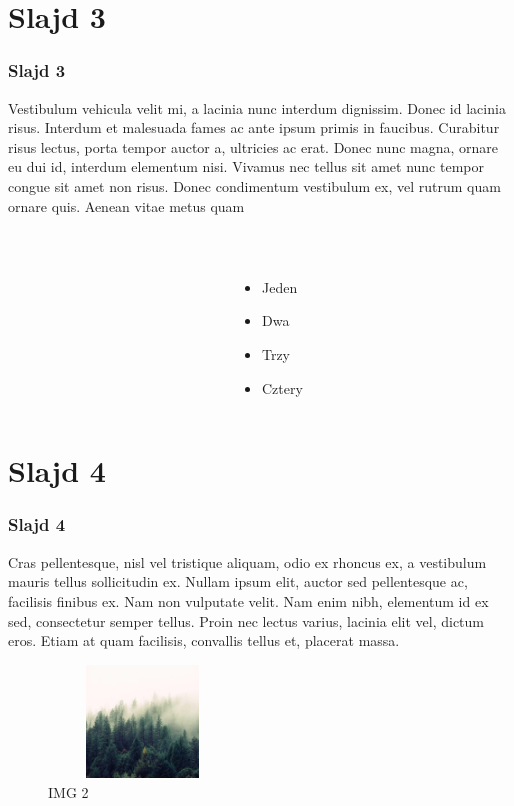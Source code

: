 \documentclass{beamer}
\begin{document}
\section{Slajd 3}
	\begin{frame}
		\frametitle{Slajd 3}
			 Vestibulum vehicula velit mi, a lacinia nunc interdum dignissim. Donec id lacinia risus. Interdum et malesuada fames ac ante ipsum primis in faucibus. Curabitur risus lectus, porta tempor auctor a, ultricies ac erat. Donec nunc magna, ornare eu dui id, interdum elementum nisi. Vivamus nec tellus sit amet nunc tempor congue sit amet non risus. Donec condimentum vestibulum ex, vel rutrum quam ornare quis. Aenean vitae metus quam
		\begin{columns}[t]
			\begin{column}{.5\textwidth}
				\label{fig: LaTex}
			\end{column}
			\begin{column}{.5\textwidth}
				\\\begin{itemize}
					\item Jeden
					\item Dwa
					\item Trzy
					\item Cztery
				\end{itemize}
			\end{column}
		\end{columns}
	\end{frame}

\section{Slajd 4}
	\begin{frame}
		\frametitle{Slajd 4}
        Cras pellentesque, nisl vel tristique aliquam, odio ex rhoncus ex, a vestibulum mauris tellus sollicitudin ex. Nullam ipsum elit, auctor sed pellentesque ac, facilisis finibus ex. Nam non vulputate velit. Nam enim nibh, elementum id ex sed, consectetur semper tellus. Proin nec lectus varius, lacinia elit vel, dictum eros. Etiam at quam facilisis, convallis tellus et, placerat massa.
		\begin{figure}[H]
			\centering
			\includegraphics[width=5cm, height=3cm]{img2.jpg}
			\caption{IMG 2}
			\label{fig: img2}
		\end{figure}
	\end{frame}
\end{document}
